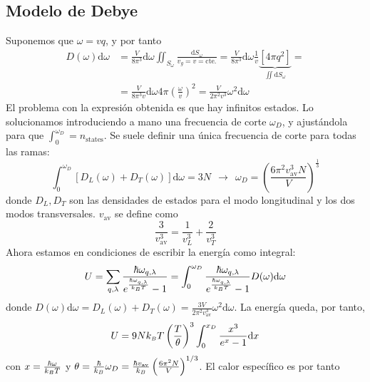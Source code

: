 \subsection{Modelo de Debye}
Suponemos que $\omega = vq$, y por tanto
\begin{equation}
\begin{split}
  D(\omega) \text{d}\omega &= \frac{V}{8\pi^3} \text{d}\omega
  \iint_{S_\omega} \frac{\text{d}S_\omega}{v_g = v = \text{cte.}} =
  \frac{V}{8\pi^3 } \text{d}\omega \frac{1}{v} \underbrace{[4\pi
    q^2]}_{\iint \text{d}S_\omega} = \\ &= \frac{V}{8\pi^3 v}\text{d}\omega
  4\pi \left( \frac{\omega}{v} \right)^2 = \frac{V}{2\pi^2 v^3}
  \omega^2 \text{d}\omega
\end{split}
\end{equation}
El problema con la expresión obtenida es que hay infinitos estados. Lo
solucionamos introduciendo a mano una frecuencia de corte $\omega_D$,
y ajustándola para que $\int_0^{\omega_D} = n_\text{states}$. Se
suele definir una única frecuencia de corte para todas las ramas:
\begin{equation}
\int_0^{\omega_D} [ D_L(\omega) + D_T(\omega) ] \text{d}\omega = 3N \ \ \rightarrow \ \ \omega_D = \left(
  \frac{6\pi^2 v_\text{av}^3 N}{V} \right)^\frac{1}{3}
\end{equation}
donde $D_L,D_T$ son las densidades de estados para el modo
longitudinal y los dos modos transversales. $v_\text{av}$ se define
como
\begin{equation}
  \frac{3}{v_\text{av}^3} = \frac{1}{v_L^3} + \frac{2}{v_T^3}
\end{equation}
Ahora estamos en condiciones de escribir la energía como integral:
\begin{equation}
  U = \sum_{q,\lambda}
  \frac{\hbar\omega_{q,\lambda}}{e^{\frac{\hbar\omega_{q,\lambda}}{k_{\scriptscriptstyle{B}} 
      T}}-1} = \int_0^{\omega_D} \frac{\hbar\omega_{q,\lambda}}{e^{\frac{\hbar\omega_{q,\lambda}}{k_{\scriptscriptstyle{B}} 
      T}}-1} D(\omega)\text{d}\omega
\end{equation}
donde $D(\omega)\text{d}\omega = D_L(\omega) + D_T (\omega) =
\frac{3V}{2\pi^2 v_\text{av}^3} \omega^2 \text{d}\omega$. La energía
queda, por tanto,
\begin{equation}
  U = 9Nk_{\scriptscriptstyle{B}}  T \left( \frac{T}{\theta} \right)^3 \int_0^{x_D}
  \frac{x^3}{e^{x}- 1} \text{d}x
\end{equation}
con $x = \frac{\hbar \omega}{k_{\scriptscriptstyle{B}}  T}$ y $\theta =  \frac{\hbar}{k_{\scriptscriptstyle{B}} } \omega_D= \frac{\hbar
  v_\text{av}}{k_{\scriptscriptstyle{B}} } \left( \frac{6\pi^2 N}{V} \right)^{1/3}$. El calor
específico es por tanto

